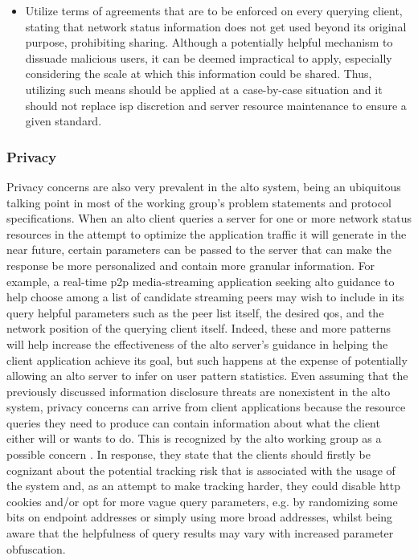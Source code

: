 \begin{itemize}
    \item Utilize terms of agreements that are to be enforced on every querying client, stating that network status information does not get used beyond its original purpose, prohibiting sharing.
        Although a potentially helpful mechanism to dissuade malicious users, it can be deemed impractical to apply, especially considering the scale at which this information could be shared.
        Thus, utilizing such means should be applied at a case-by-case situation and it should not replace \gls{isp} discretion and server resource maintenance to ensure a given standard.
\end{itemize}

\subsubsection{Privacy}%

    Privacy concerns are also very prevalent in the \gls{alto} system, being an ubiquitous talking point in most of the working group's problem statements and protocol specifications.
    When an \gls{alto} client queries a server for one or more network status resources in the attempt to optimize the application traffic it will generate in the near future, certain parameters can be passed to the server that can make the response be more personalized and contain more granular information.
    For example, a real-time \gls{p2p} media-streaming application seeking \gls{alto} guidance to help choose among a list of candidate streaming peers may wish to include in its query helpful parameters such as the peer list itself, the desired \gls{qos}, and the network position of the querying client itself.
    Indeed, these and more patterns will help increase the effectiveness of the \gls{alto} server's guidance in helping the client application achieve its goal, but such happens at the expense of potentially allowing an \gls{alto} server to infer on user pattern statistics.
    Even assuming that the previously discussed information disclosure threats are nonexistent in the \gls{alto} system, privacy concerns can arrive from client applications because the resource queries they need to produce can contain information about what the client either will or wants to do.
    This is recognized by the \gls{alto} working group as a possible concern \cite{alto-protocol} \cite{alto-problem-statement}.
    In response, they state that the clients should firstly be cognizant about the potential tracking risk that is associated with the usage of the system and, as an attempt to make tracking harder, they could disable \gls{http} cookies and/or opt for more vague query parameters, e.g. by randomizing some bits on endpoint addresses or simply using more broad addresses, whilst being aware that the helpfulness of query results may vary with increased parameter obfuscation.

